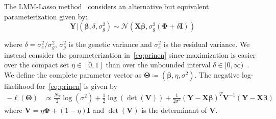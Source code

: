 \documentclass[12pt,letter]{article}\usepackage[]{graphicx}\usepackage[]{color}
\newcommand{\bX}{\textbf{X}}
\newcommand{\bY}{\textbf{Y}}
\newcommand{\bV}{\textbf{V}}
\newcommand{\bI}{\textbf{I}}
\newcommand{\bTheta}{\boldsymbol{\Theta}}
\newcommand{\bbeta}{\boldsymbol{\beta}}
\newcommand{\bPhi}{\boldsymbol{\Phi}}
\begin{document}
The LMM-Lasso method~\citep{rakitsch2013lasso} considers an alternative but equivalent parameterization given by:
\begin{equation}
	\bY | (\bbeta, \delta, \sigma_g^2) \sim \mathcal{N}(\bX \bbeta, \sigma_g^2(\bPhi + \delta\bI)) \label{eq:lippert}
\end{equation}

where $\delta = \sigma^2_e / \sigma^2_g$, $\sigma^2_g$ is the genetic variance and $\sigma^2_e$ is the residual variance. We instead consider the parameterization in~\eqref{eq:prinen} since maximization is easier over the compact set $\eta \in [0,1]$ than over the unbounded interval $\delta \in [0, \infty)$~\citep{pirinen2013efficient}. We define the complete parameter vector as $\bTheta \coloneqq \left(\bbeta, \eta, \sigma^2 \right)$. The negative log-likelihood for~\eqref{eq:prinen} is given by
\begin{align}
	-\ell(\bTheta) & \propto \frac{N_T}{2}\log(\sigma^2) + \frac{1}{2}\log\left(\det(\bV)\right) + \frac{1}{2\sigma^2} \left(\bY - \bX \bbeta\right)^T \bV^{-1} \left(\bY - \bX \bbeta\right)  \label{eq:LogLike}
\end{align}
where $\bV = \eta \bPhi + (1-\eta) \bI$ and $\det(\bV)$ is the determinant of $\bV$.
\end{document}
